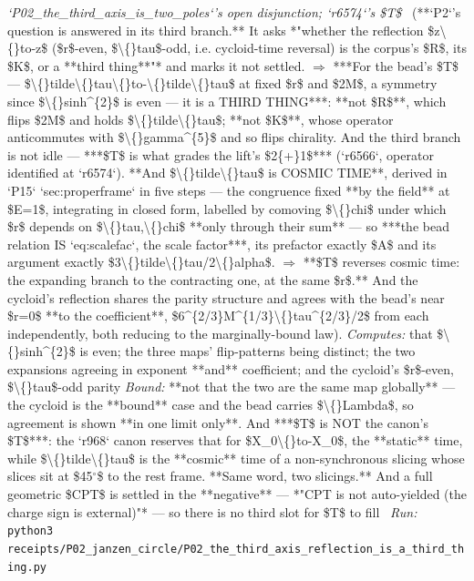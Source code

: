 \begin{description}
\textit{`P02\_the\_third\_axis\_is\_two\_poles`'s open disjunction; `r6574`'s \$T\$} \ (**`P2`'s question is answered in its third branch.** It asks *"whether the reflection \$z\textbackslash\{\}to-z\$ (\$r\$-even, \$\textbackslash\{\}tau\$-odd, i.e. cycloid-time reversal) is the corpus's \$R\$, its \$K\$, or a **third thing**"* and marks it not settled. \ensuremath{\Rightarrow} ***For the bead's \$T\$ --- \$\textbackslash\{\}tilde\textbackslash\{\}tau\textbackslash\{\}to-\textbackslash\{\}tilde\textbackslash\{\}tau\$ at fixed \$r\$ and \$2M\$, a symmetry since \$\textbackslash\{\}sinh\textasciicircum{}\{2\}\$ is even --- it is a THIRD THING***: **not \$R\$**, which flips \$2M\$ and holds \$\textbackslash\{\}tilde\textbackslash\{\}tau\$; **not \$K\$**, whose operator anticommutes with \$\textbackslash\{\}gamma\textasciicircum{}\{5\}\$ and so flips chirality.  And the third branch is not idle --- ***\$T\$ is what grades the lift's \$2\{+\}1\$*** (`r6566`, operator identified at `r6574`).  **And \$\textbackslash\{\}tilde\textbackslash\{\}tau\$ is COSMIC TIME**, derived in `P15` `sec:properframe` in five steps --- the congruence fixed **by the field** at \$E=1\$, integrating in closed form, labelled by comoving \$\textbackslash\{\}chi\$ under which \$r\$ depends on \$\textbackslash\{\}tau,\textbackslash\{\}chi\$ **only through their sum** --- so ***the bead relation IS `eq:scalefac`, the scale factor***, its prefactor exactly \$A\$ and its argument exactly \$3\textbackslash\{\}tilde\textbackslash\{\}tau/2\textbackslash\{\}alpha\$. \ensuremath{\Rightarrow} **\$T\$ reverses cosmic time: the expanding branch to the contracting one, at the same \$r\$.**  And the cycloid's reflection shares the parity structure and agrees with the bead's near \$r=0\$ **to the coefficient**, \$6\textasciicircum{}\{2/3\}M\textasciicircum{}\{1/3\}\textbackslash\{\}tau\textasciicircum{}\{2/3\}/2\$ from each independently, both reducing to the marginally-bound law). 
\emph{Computes:} that \$\textbackslash\{\}sinh\textasciicircum{}\{2\}\$ is even; the three maps' flip-patterns being distinct; the two expansions agreeing in exponent **and** coefficient; and the cycloid's \$r\$-even, \$\textbackslash\{\}tau\$-odd parity
 \emph{Bound:}  **not that the two are the same map globally** --- the cycloid is the **bound** case and the bead carries \$\textbackslash\{\}Lambda\$, so agreement is shown **in one limit only**.  And ***\$T\$ is NOT the canon's \$T\$***: the `r968` canon reserves that for \$X\_0\textbackslash\{\}to-X\_0\$, the **static** time, while \$\textbackslash\{\}tilde\textbackslash\{\}tau\$ is the **cosmic** time of a non-synchronous slicing whose slices sit at \$45\ensuremath{^\circ}\$ to the rest frame. **Same word, two slicings.** And a full geometric \$CPT\$ is settled in the **negative** --- *"CPT is not auto-yielded (the charge sign is external)"* --- so there is no third slot for \$T\$ to fill
\ \emph{Run:} \texttt{python3 receipts/P02\_janzen\_circle/P02\_the\_third\_axis\_reflection\_is\_a\_third\_thing.py}
\end{description}\endgroup
